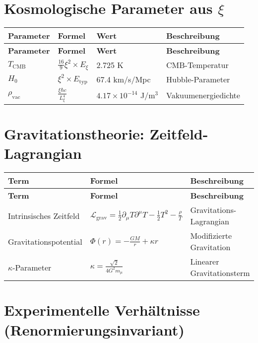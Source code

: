 \documentclass[12pt,a4paper]{article}
\begin{document}
	\section{Kosmologische Parameter aus \(\xi\)}
	
	\begin{longtable}{|p{3cm}|p{4cm}|p{4cm}|p{4cm}|}
		\hline
		\textbf{Parameter} & \textbf{Formel} & \textbf{Wert} & \textbf{Beschreibung} \\
		\hline
		\endfirsthead
		\hline
		\textbf{Parameter} & \textbf{Formel} & \textbf{Wert} & \textbf{Beschreibung} \\
		\hline
		\endhead
		\(T_{\text{CMB}}\) & \(\frac{16}{9}\xi^{2} \times E_{\xi}\) & 2.725 K & CMB-Temperatur \\
		\hline
		\(H_0\) & \(\xi^{2} \times E_{\text{typ}}\) & 67.4 km/s/Mpc & Hubble-Parameter \\
		\hline
		\(\rho_{\text{vac}}\) & \(\frac{\xi\hbar c}{L_{\xi}^{4}}\) & \(4.17 \times 10^{-14}\) J/m\(^3\) & Vakuumenergiedichte \\
		\hline
	\end{longtable}
	
	\section{Gravitationstheorie: Zeitfeld-Lagrangian}
	
	\begin{longtable}{|p{4cm}|p{5cm}|p{5cm}|}
		\hline
		\textbf{Term} & \textbf{Formel} & \textbf{Beschreibung} \\
		\hline
		\endfirsthead
		\hline
		\textbf{Term} & \textbf{Formel} & \textbf{Beschreibung} \\
		\hline
		\endhead
		Intrinsisches Zeitfeld & \(\mathcal{L}_{\text{grav}} = \frac{1}{2}\partial_{\mu}T\partial^{\mu}T - \frac{1}{2}T^{2} - \frac{\rho}{T}\) & Gravitations-Lagrangian \\
		\hline
		Gravitationspotential & \(\Phi(r) = -\frac{GM}{r} + \kappa r\) & Modifizierte Gravitation \\
		\hline
		\(\kappa\)-Parameter & \(\kappa = \frac{\sqrt{2}}{4G^{2}m_{\mu}}\) & Linearer Gravitationsterm \\
		\hline
	\end{longtable}
	
	\section{Experimentelle Verhältnisse (Renormierungsinvariant)}
	
\end{document}
